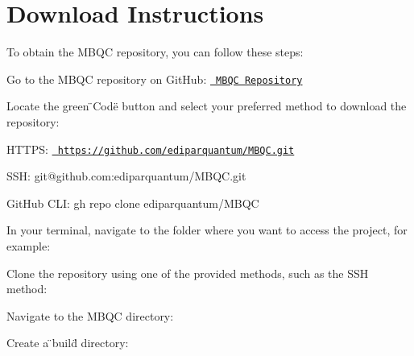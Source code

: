 \chapter{Download Instructions}
\hypertarget{download_instructions}{}\label{download_instructions}
To obtain the MBQC repository, you can follow these steps\+:


\begin{DoxyEnumerate}
\item Go to the MBQC repository on Git\+Hub\+: \href{https://github.com/ediparquantum/MBQC}{\texttt{ MBQC Repository}}
\item Locate the green \"{}\+Code\"{} button and select your preferred method to download the repository\+:
\begin{DoxyItemize}
\item HTTPS\+: {\ttfamily \href{https://github.com/ediparquantum/MBQC.git}{\texttt{ https\+://github.\+com/ediparquantum/\+MBQC.\+git}}}
\item SSH\+: {\ttfamily git@github.\+com\+:ediparquantum/\+MBQC.\+git}
\item Git\+Hub CLI\+: {\ttfamily gh repo clone ediparquantum/\+MBQC}
\end{DoxyItemize}
\end{DoxyEnumerate}

In your terminal, navigate to the folder where you want to access the project, for example\+: 
\begin{DoxyCode}{0}

\end{DoxyCode}


Clone the repository using one of the provided methods, such as the SSH method\+: 
\begin{DoxyCode}{0}

\end{DoxyCode}


Navigate to the MBQC directory\+: 
\begin{DoxyCode}{0}

\end{DoxyCode}


Create a \"{}build\"{} directory\+: 
\begin{DoxyCode}{0}

\end{DoxyCode}



